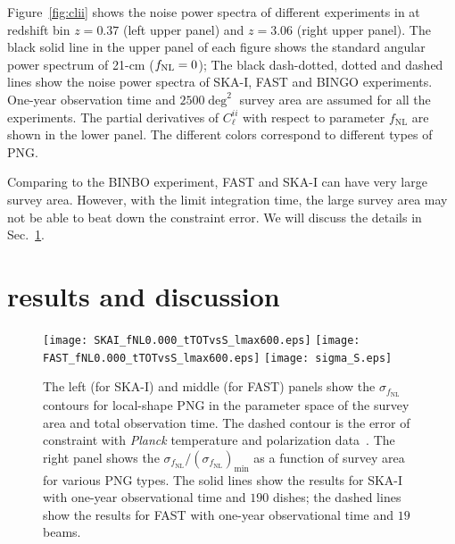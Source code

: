 \documentclass[twocolumn,floatfix,nofootinbib,aps,reprint]{revtex4}
\begin{document}
Figure~\ref{fig:clii} shows the noise power spectra of different experiments 
in at redshift bin $z=0.37$ (left upper panel) and $z=3.06$ (right upper panel). 
The black solid line in the upper panel of each figure shows the standard angular
power spectrum of 21-cm ($f_{\rm NL}=0$); The black dash-dotted, dotted and dashed lines
show the noise power spectra of SKA-I, FAST and BINGO experiments.
One-year observation time and $2500\deg^2$ survey area are assumed 
for all the experiments.
The partial derivatives of $C_\ell^{ii}$ with respect to parameter 
$f_\mathrm{NL}$ are shown in the lower panel. The different colors
correspond to different types of PNG.

Comparing to the BINBO experiment, FAST and SKA-I can have very large survey area.
However, with the limit integration time, the large survey area
may not be able to beat down the constraint error.
We will discuss the details in Sec.~\ref{sec:result}.

\section{results and discussion}\label{sec:result}
\begin{figure*}[htb]
    \centerline{
    \texttt{[image: SKAI\_fNL0.000\_tTOTvsS\_lmax600.eps]}
    \texttt{[image: FAST\_fNL0.000\_tTOTvsS\_lmax600.eps]}
    \texttt{[image: sigma\_S.eps]}}
    \vspace{-0.3cm}
    \caption{
        The left (for SKA-I) and middle (for FAST) panels show the $\sigma_{f_\mathrm{NL}}$ contours 
        for local-shape PNG in the parameter space of the 
        survey area and total observation time. The dashed contour
        is the error of constraint with {\it Planck} temperature and 
        polarization data~\cite{2016A&A...594A..17P}. The right panel shows the 
        $\sigma_{f_\mathrm{NL}}/(\sigma_{f_\mathrm{NL}})_\mathrm{min}$ 
        as a function of survey area for
        various PNG types. The solid lines
        show the results for SKA-I with one-year observational time and
        $190$ dishes; the dashed lines show the results for FAST with
        one-year observational time and $19$ beams.
    }\label{fig:ska_ts}
\end{figure*}
\end{document}
